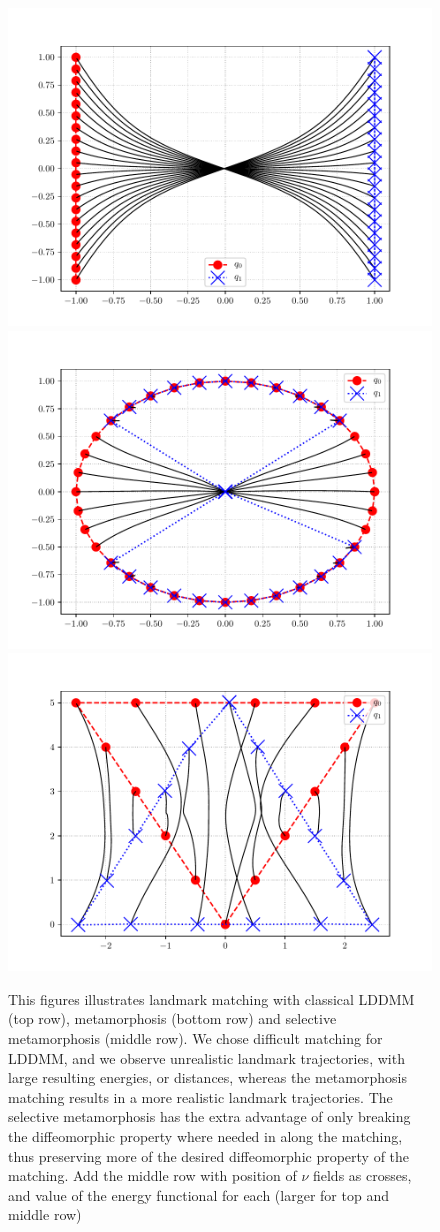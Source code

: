 \documentclass[runningheads]{llncs}
\begin{document}
\begin{figure}
\begin{minipage}{\textwidth}
    \includegraphics[width=.3\textwidth]{mm_criss_cross.pdf}\quad
    \includegraphics[width=.3\textwidth]{mm_squeeze.pdf}\quad
    \includegraphics[width=.3\textwidth]{mm_triangle_flip.pdf}
    \caption{This figures illustrates landmark matching with classical LDDMM
    (top row), metamorphosis (bottom row) and selective metamorphosis (middle
    row).  We chose difficult matching for LDDMM, and we observe unrealistic
    landmark trajectories, with large resulting energies, or distances, whereas
    the metamorphosis  matching results in a more realistic landmark
    trajectories.  The selective metamorphosis has the extra advantage of only
    breaking the diffeomorphic property where needed in along the matching, thus
    preserving more of the desired diffeomorphic property of the matching.
    {\color{red} Add the middle row with position of $\nu$ fields as crosses,
    and value of the energy functional for each (larger for top and middle
    row)}}
    \label{fig:mm_lddmm}
\end{minipage}
\end{figure}

\end{document}
